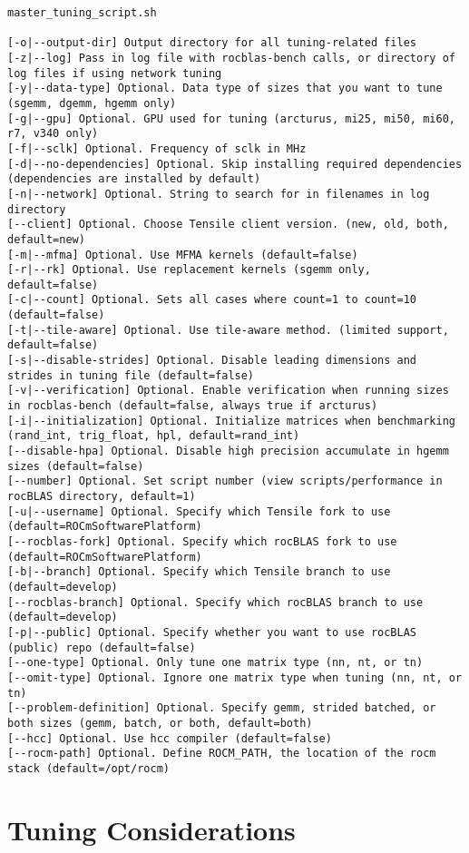 \documentclass[]{article}
\begin{document}
\begin{verbatim}
master_tuning_script.sh

[-o|--output-dir] Output directory for all tuning-related files
[-z|--log] Pass in log file with rocblas-bench calls, or directory of log files if using network tuning
[-y|--data-type] Optional. Data type of sizes that you want to tune (sgemm, dgemm, hgemm only)
[-g|--gpu] Optional. GPU used for tuning (arcturus, mi25, mi50, mi60, r7, v340 only)
[-f|--sclk] Optional. Frequency of sclk in MHz
[-d|--no-dependencies] Optional. Skip installing required dependencies (dependencies are installed by default)
[-n|--network] Optional. String to search for in filenames in log directory
[--client] Optional. Choose Tensile client version. (new, old, both, default=new)
[-m|--mfma] Optional. Use MFMA kernels (default=false)
[-r|--rk] Optional. Use replacement kernels (sgemm only, default=false)
[-c|--count] Optional. Sets all cases where count=1 to count=10 (default=false)
[-t|--tile-aware] Optional. Use tile-aware method. (limited support, default=false)
[-s|--disable-strides] Optional. Disable leading dimensions and strides in tuning file (default=false)
[-v|--verification] Optional. Enable verification when running sizes in rocblas-bench (default=false, always true if arcturus)
[-i|--initialization] Optional. Initialize matrices when benchmarking (rand_int, trig_float, hpl, default=rand_int)
[--disable-hpa] Optional. Disable high precision accumulate in hgemm sizes (default=false)
[--number] Optional. Set script number (view scripts/performance in rocBLAS directory, default=1)
[-u|--username] Optional. Specify which Tensile fork to use (default=ROCmSoftwarePlatform)
[--rocblas-fork] Optional. Specify which rocBLAS fork to use (default=ROCmSoftwarePlatform)
[-b|--branch] Optional. Specify which Tensile branch to use (default=develop)
[--rocblas-branch] Optional. Specify which rocBLAS branch to use (default=develop)
[-p|--public] Optional. Specify whether you want to use rocBLAS (public) repo (default=false)
[--one-type] Optional. Only tune one matrix type (nn, nt, or tn)
[--omit-type] Optional. Ignore one matrix type when tuning (nn, nt, or tn)
[--problem-definition] Optional. Specify gemm, strided batched, or both sizes (gemm, batch, or both, default=both)
[--hcc] Optional. Use hcc compiler (default=false)
[--rocm-path] Optional. Define ROCM_PATH, the location of the rocm stack (default=/opt/rocm)
\end{verbatim}

\section{Tuning Considerations}
\end{document}
